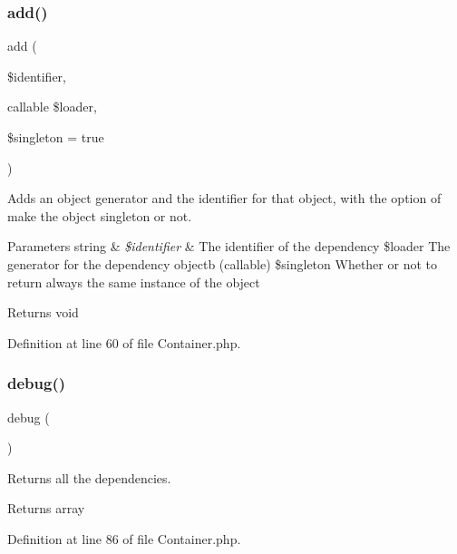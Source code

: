 \subsubsection{\texorpdfstring{add()}{add()}}
{\footnotesize\ttfamily add (\begin{DoxyParamCaption}\item[{}]{\$identifier,  }\item[{callable}]{\$loader,  }\item[{}]{\$singleton = {\ttfamily true} }\end{DoxyParamCaption})}

Adds an object generator and the identifier for that object, with the option of make the object \textquotesingle{}singleton\textquotesingle{} or not.


\begin{DoxyParams}[1]{Parameters}
string & {\em \$identifier} & The identifier of the dependency \$loader The generator for the dependency objectb (callable) \$singleton Whether or not to return always the same instance of the object\\
\hline
\end{DoxyParams}
\begin{DoxyReturn}{Returns}
void 
\end{DoxyReturn}


Definition at line 60 of file Container.\+php.

\mbox{\label{class_zest_1_1_common_1_1_container_1_1_container_aaed74f7942d3fc56582e99324500e87b}} 
\subsubsection{\texorpdfstring{debug()}{debug()}}
{\footnotesize\ttfamily debug (\begin{DoxyParamCaption}{ }\end{DoxyParamCaption})}

Returns all the dependencies.

\begin{DoxyReturn}{Returns}
array 
\end{DoxyReturn}


Definition at line 86 of file Container.\+php.

